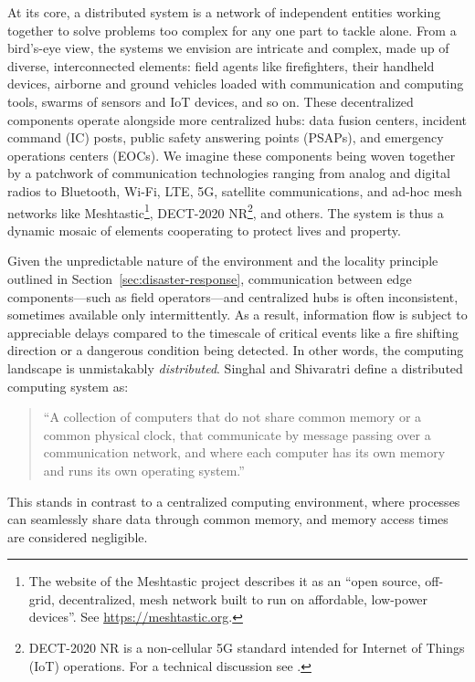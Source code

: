 \documentclass[]             %
{NASA}                       %
\theoremstyle{definition}
\begin{document}
At its core, a distributed system is a network of independent entities
working together to solve problems too complex for any one part to
tackle alone. From a bird’s-eye view, the systems we envision are
intricate and complex, made up of diverse, interconnected elements:
field agents like firefighters, their handheld devices, airborne and
ground vehicles loaded with communication and computing tools, swarms
of sensors and IoT devices, and so on. These decentralized components
operate alongside more centralized hubs: data fusion centers, incident
command (IC) posts, public safety answering points (PSAPs), and
emergency operations centers (EOCs). We imagine these components being
woven together by a patchwork of communication technologies ranging
from analog and digital radios to Bluetooth, Wi-Fi, LTE, 5G, satellite
communications, and ad-hoc mesh networks like Meshtastic\footnote{The
  website of the Meshtastic project describes it as an ``open source,
  off-grid, decentralized, mesh network built to run on affordable,
  low-power devices''. See \url{https://meshtastic.org}.}, DECT-2020
NR\footnote{DECT-2020 NR is a non-cellular 5G
  standard intended for Internet of Things (IoT) operations. For a
  technical discussion see \cite{2022:dect-2020-nr}.}, and others. The
system is thus a dynamic mosaic of elements cooperating to protect
lives and property.

Given the unpredictable nature of the environment and the locality
principle outlined in Section~\ref{sec:disaster-response},
communication between edge components---such as field operators---and
centralized hubs is often inconsistent, sometimes available only
intermittently. As a result, information flow is subject to
appreciable delays compared to the timescale of critical events like a
fire shifting direction or a dangerous condition being detected. In
other words, the computing landscape is unmistakably
\emph{distributed}. Singhal and Shivaratri \cite{10.5555/562065}
define a distributed computing system as:
\begin{quote}
  ``A collection of computers that do not share common
  memory or a common physical clock, that communicate by message
  passing over a communication network, and where each computer has
  its own memory and runs its own operating system.''
\end{quote}
This stands in contrast to a centralized computing environment, where
processes can seamlessly share data through common memory, and memory
access times are considered negligible.
\end{document}
